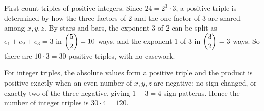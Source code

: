 First count triples of positive integers. Since $24=2^3\cdot3$, a positive triple is determined by how the three factors of $2$ and the one factor of $3$ are shared among $x,y,z$. By stars and bars, the exponent $3$ of $2$ can be split as $e_1+e_2+e_3=3$ in $\dbinom{5}{2}=10$ ways, and the exponent $1$ of $3$ in $\dbinom{3}{2}=3$ ways. So there are $10\cdot3=30$ positive triples, with no casework.

For integer triples, the absolute values form a positive triple and the product is positive exactly when an even number of $x,y,z$ are negative: no sign changed, or exactly two of the three negative, giving $1+3=4$ sign patterns. Hence the number of integer triples is $30\cdot4=\boxed{120}$.
